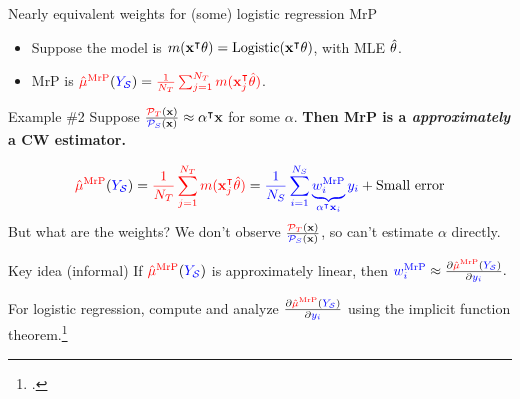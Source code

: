 \begin{frame}[t]{Nearly equivalent weights for (some) logistic regression MrP}

\def\alphav{\mathbf{\alpha}}
%
\begin{itemize}
    \item Suppose the model is $m(\mathbf{x}^\intercal \theta) = \mathrm{Logistic}(\mathbf{x}^\intercal \theta)$, with MLE $\hat{\theta}$.
    \item MrP is $\textcolor{red}{\hat{\mu}^{\mathrm{MrP}}}(\textcolor{blue}{\textcolor{blue}{Y_{\mathcal{S}}}}) = \textcolor{red}{\frac{1}{{N_T}} \sum_{j=1}^{N_T} m(\mathbf{x}_j^\intercal \hat{\theta})}$.
\end{itemize}
%
\begin{block}{Example \#2}
Suppose
    $\frac{\ptar(\x)}{\psur(\x)} \approx \alphav^\trans \x$ for some $\alpha$.
    \textbf{Then MrP is a \emph{approximately} a CW estimator.}
\end{block}

$$
\begin{aligned}
\muhatmrp =
    \tarcol{\meantar \m(\x_j^\trans \thetahat)} ={}
    \surcol{
        \meansur
        \underbrace{\w_i^\mrp}_{\alphav^\trans \x_i} \y_i
    }  + \textrm{Small error}
\end{aligned}
$$
But what are the weights?
We don't observe $\frac{\textcolor{red}{\mathcal{P}_{T}}(\mathbf{x})}{\textcolor{blue}{{\mathcal{P}_{S}}}(\mathbf{x})}$, so can't estimate $\alpha$
directly.\pause

\begin{block}{Key idea (informal)}
\centering
If $\textcolor{red}{\hat{\mu}^{\mathrm{MrP}}}(\textcolor{blue}{\textcolor{blue}{Y_{\mathcal{S}}}})$ is approximately linear, then
$\textcolor{blue}{w_i^{\mathrm{MrP}}} \approx \frac{\partial \textcolor{red}{\hat{\mu}^{\mathrm{MrP}}}(\textcolor{blue}{\textcolor{blue}{Y_{\mathcal{S}}}})}{\partial \textcolor{blue}{y_i}}.$\\
\end{block}\pause

For logistic regression, compute and analyze $\frac{\partial \textcolor{red}{\hat{\mu}^{\mathrm{MrP}}}(\textcolor{blue}{\textcolor{blue}{Y_{\mathcal{S}}}})}{\partial \textcolor{blue}{y_i}}$
using the implicit function theorem.\footcite{krantz:2012:implicit,giordano:2019:swiss}

\end{frame}




